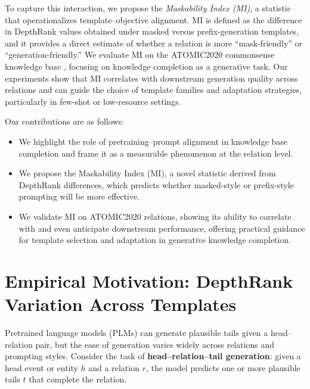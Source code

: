 \documentclass{i4c-en}
\begin{document}


To capture this interaction, we propose the \emph{Maskability Index (MI)}, a statistic that operationalizes template–objective alignment. MI is defined as the difference in DepthRank values obtained under masked versus prefix-generation templates, and it provides a direct estimate of whether a relation is more “mask-friendly” or “generation-friendly.” We evaluate MI on the ATOMIC2020 commonsense knowledge base \cite{atomic2020}, focusing on knowledge completion as a generative task. Our experiments show that MI correlates with downstream generation quality across relations and can guide the choice of template families and adaptation strategies, particularly in few-shot or low-resource settings.

Our contributions are as follows:
\begin{itemize}
	\item We highlight the role of pretraining–prompt alignment in knowledge base completion and frame it as a measurable phenomenon at the relation level.
	\item We propose the Maskability Index (MI), a novel statistic derived from DepthRank differences, which predicts whether masked-style or prefix-style prompting will be more effective.
	\item We validate MI on ATOMIC2020 relations, showing its ability to correlate with and even anticipate downstream performance, offering practical guidance for template selection and adaptation in generative knowledge completion.
\end{itemize}


\section{Empirical Motivation: DepthRank Variation Across Templates}

Pretrained language models (PLMs) can generate plausible tails given a head–relation pair, but the ease of generation varies widely across relations and prompting styles. Consider the task of \textbf{head--relation--tail generation}: given a head event or entity \(h\) and a relation \(r\), the model predicts one or more plausible tails \(t\) that complete the relation.  
\end{document}

